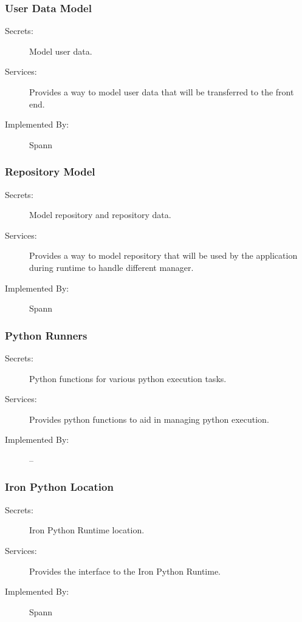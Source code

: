 \documentclass[12pt, titlepage]{article}
\begin{document}
\subsubsection{User Data Model} \label{mdUserDM} 

\begin{description}
\item[Secrets:] Model user data.
\item[Services:] Provides a way to model user data that will be transferred to the front end.
\item[Implemented By:] Spann
\end{description}

\subsubsection{Repository Model} \label{mdRepoModel} 

\begin{description}
\item[Secrets:] Model repository and repository data.
\item[Services:] Provides a way to model repository that will be used by the
    application during runtime to handle different manager.
\item[Implemented By:] Spann
\end{description}

\subsubsection{Python Runners} \label{mdPythonRunners} 

\begin{description}
\item[Secrets:] Python functions for various python execution tasks.
\item[Services:] Provides python functions to aid in managing python execution.
\item[Implemented By:] --
\end{description}

\subsubsection{Iron Python Location} \label{mdIronPythonLocation} 

\begin{description}
\item[Secrets:] Iron Python Runtime location.
\item[Services:] Provides the interface to the Iron Python Runtime.
\item[Implemented By:] Spann
\end{description}
\end{document}
